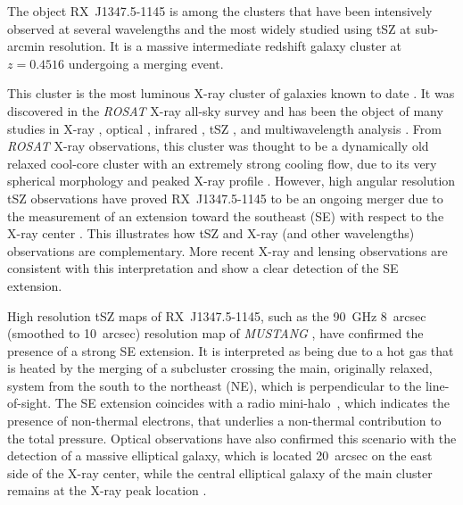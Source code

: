 The object RX~J1347.5-1145 is among the clusters that have been intensively observed at several wavelengths and the most widely studied using tSZ at sub-arcmin resolution. It is a massive intermediate redshift galaxy cluster at $z = 0.4516$ undergoing a merging event.

This cluster is the most luminous \mbox{X-ray} cluster of galaxies known to date \citep[{\it e.g.}][]{allen_2002}. It was discovered in the {\it ROSAT} \mbox{X-ray} all-sky survey \citep{voges1999} and has been the object of many studies in \mbox{X-ray} \citep{schindler_1995, schindler_1997, allen_2002, gitti_2004, gitti_2005, gitti_2007, gitti_2007_bis, ota_2008}, optical \citep{cohen_kneib_2002, verdugo_2012}, infrared \citep{zemcov2007}, tSZ \citep{pointecouteau_1999, komatsu1999, pointecouteau_2001, komatsu_2001, kitayama_2004, mason_2010, korngut_2011, zemcov2012, plagge_2012}, and multiwavelength analysis \citep{bradac_2008, miranda_2008, johnson_2012}. From {\it ROSAT} \mbox{X-ray} observations, this cluster was thought to be a dynamically old relaxed cool-core cluster with an extremely strong cooling flow, due to its very spherical morphology and peaked \mbox{X-ray} profile \citep[{\it ROSAT};][]{schindler_1995, schindler_1997}. However, high angular resolution tSZ observations have proved RX~J1347.5-1145 to be an ongoing merger due to the measurement of an extension toward the southeast (SE) with respect to the \mbox{X-ray} center \citep{pointecouteau_1999, komatsu_2001, kitayama_2004}. This illustrates how tSZ and \mbox{X-ray} (and other wavelengths) observations are complementary. More recent \mbox{X-ray} \citep[{\it Chandra};][]{allen_2002} and lensing \citep{miranda_2008} observations are consistent with this interpretation and show a clear detection of the SE extension.

High resolution tSZ maps of RX~J1347.5-1145, such as the 90~GHz 8~arcsec (smoothed to 10~arcsec) resolution map of {\it MUSTANG} \citep{mason_2010}, have confirmed the presence of a strong SE extension. It is interpreted as being due to a hot gas that is heated by the merging of a subcluster crossing the main, originally relaxed, system from the south to the northeast (NE), which is perpendicular to the line-of-sight. The SE extension coincides with a radio mini-halo~\citep{gitti_2007_bis}, which indicates the presence of non-thermal electrons, that underlies a non-thermal contribution to the total pressure. Optical observations have also confirmed this scenario with the detection of a massive elliptical galaxy, which is located 20~arcsec on the east side of the \mbox{X-ray} center, while the central elliptical galaxy of the main cluster remains at the \mbox{X-ray} peak location \citep{cohen_kneib_2002}. 

